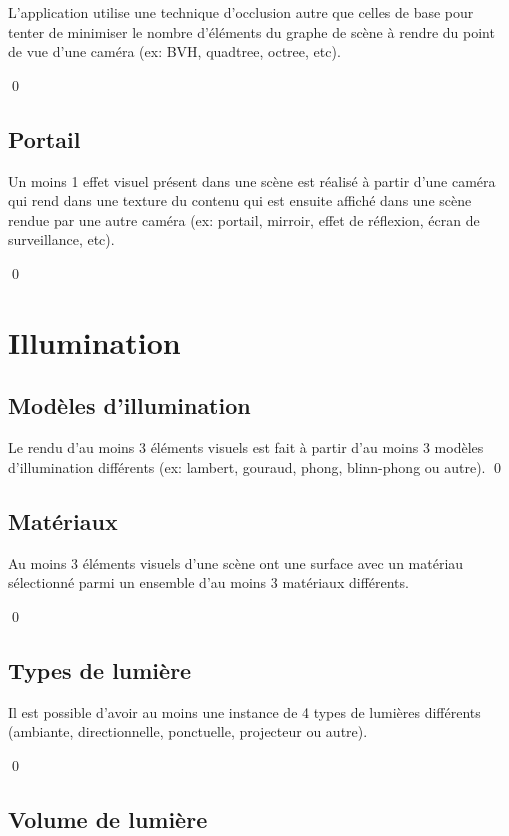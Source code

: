 \documentclass[12pt]{article}
\newcommand{\state}{\noindent}
\begin{document}
\state
L'application utilise une technique d'occlusion autre que celles de base pour tenter de minimiser le nombre d'éléments du graphe de scène à rendre du point de vue d'une caméra (ex: BVH, quadtree, octree, etc).

\qed

\subsection{Portail}

\state
Un moins 1 effet visuel présent dans une scène est réalisé à partir d'une caméra qui rend dans une texture du contenu qui est ensuite affiché dans une scène rendue par une autre caméra (ex: portail, mirroir, effet de réflexion, écran de surveillance, etc). 

\qed

\pagebreak


\section{Illumination}

\subsection{Modèles d'illumination}

\state
Le rendu d'au moins 3 éléments visuels est fait à partir d'au moins 3 modèles d'illumination différents (ex: lambert, gouraud, phong, blinn-phong ou autre). 
\qed

\subsection{Matériaux}

\state
Au moins 3 éléments visuels d'une scène ont une surface avec un matériau sélectionné parmi un ensemble d'au moins 3 matériaux différents. 

\qed

\subsection{Types de lumière}

\state
Il est possible d'avoir au moins une instance de 4 types de lumières différents (ambiante, directionnelle, ponctuelle, projecteur ou autre).

\qed

\subsection{Volume de lumière}
\end{document}
